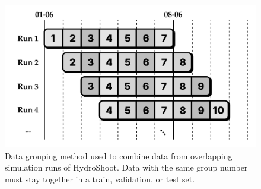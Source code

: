 \begin{figure}[]
	\centering
    \includegraphics[width=11.65cm]{img/hs-grouping.png}
	\caption[Data grouping method used to combine data from overlapping simulation runs of HydroShoot.]{Data grouping method used to combine data from overlapping simulation runs of HydroShoot. Data with the same group number must stay together in a train, validation, or test set.}
	\label{fig:hydroshoot-grouping}
\end{figure}